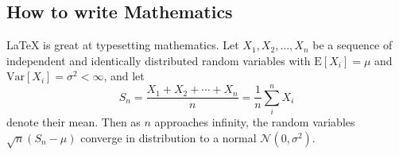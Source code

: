 \documentclass{article}
\begin{document}
\subsection{How to write Mathematics}

\LaTeX{} is great at typesetting mathematics. Let $X_1, X_2, \ldots, X_n$ be a sequence of independent and identically distributed random variables with $\text{E}[X_i] = \mu$ and $\text{Var}[X_i] = \sigma^2 < \infty$, and let
\[S_n = \frac{X_1 + X_2 + \cdots + X_n}{n}
      = \frac{1}{n}\sum_{i}^{n} X_i\]
denote their mean. Then as $n$ approaches infinity, the random variables $\sqrt{n}(S_n - \mu)$ converge in distribution to a normal $\mathcal{N}(0, \sigma^2)$.


% 
% 
\end{document}
